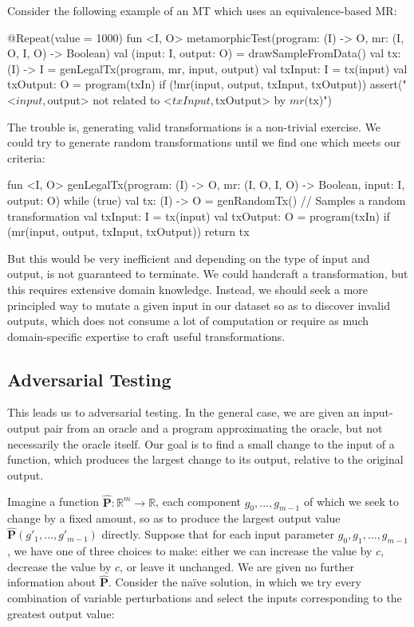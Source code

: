 \documentclass[12pt,initial,twoside,maitrise]{dms}
\numberwithin{equation}{section}
\numberwithin{table}{chapter}
\numberwithin{figure}{chapter}
\begin{document}
Consider the following example of an MT which uses an equivalence-based MR:

\begin{kotlinlisting}
@Repeat(value = 1000)
fun <I, O> metamorphicTest(program: (I) -> O, mr: (I, O, I, O) -> Boolean) {
    val (input: I, output: O) = drawSampleFromData()
    val tx: (I) -> I = genLegalTx(program, mr, input, output)
    val txInput: I = tx(input)
    val txOutput: O = program(txIn)
    if (!mr(input, output, txInput, txOutput))
        assert("<$input, $output> not related to <$txInput, $txOutput> by $mr ($tx)")
}
\end{kotlinlisting}
%
The trouble is, generating valid transformations is a non-trivial exercise. We could try to generate random transformations until we find one which meets our criteria:
%
\begin{kotlinlisting}
fun <I, O> genLegalTx(program: (I) -> O, mr: (I, O, I, O) -> Boolean, input: I, output: O) {
    while (true) {
        val tx: (I) -> O = genRandomTx() // Samples a random transformation
        val txInput: I = tx(input)
        val txOutput: O = program(txIn)
        if (mr(input, output, txInput, txOutput)) return tx
    }
}
\end{kotlinlisting}

But this would be very inefficient and depending on the type of input and output, is not guaranteed to terminate. We could handcraft a transformation, but this requires extensive domain knowledge. Instead, we should seek a more principled way to mutate a given input in our dataset so as to discover invalid outputs, which does not consume a lot of computation or require as much domain-specific expertise to craft useful transformations.

\subsection{Adversarial Testing}

This leads us to adversarial testing. In the general case, we are given an input-output pair from an oracle and a program approximating the oracle, but not necessarily the oracle itself. Our goal is to find a small change to the input of a function, which produces the largest change to its output, relative to the original output.

Imagine a function $\mathbf{\hat P}: \mathbb R^m \rightarrow \mathbb R$, each component $g_0, ..., g_{m-1}$ of which we seek to change by a fixed amount, so as to produce the largest output value $\mathbf{\hat P}(g'_1, ..., g'_{m-1})$ directly. Suppose that for each input parameter $g_0, g_1, \ldots, g_{m-1}$, we have one of three choices to make: either we can increase the value by $c$, decrease the value by $c$, or leave it unchanged. We are given no further information about $\mathbf{\hat P}$. Consider the na\"ive solution, in which we try every combination of variable perturbations and select the inputs corresponding to the greatest output value:
\end{document}
